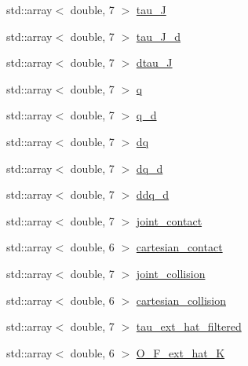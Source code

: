 \begin{DoxyCompactItemize}
\item 
std\+::array$<$ double, 7 $>$ \hyperlink{structresearch__interface_1_1robot_1_1RobotState_a628f89cdefb369bb24c0acfd243ce51d}{tau\+\_\+J}
\item 
std\+::array$<$ double, 7 $>$ \hyperlink{structresearch__interface_1_1robot_1_1RobotState_a83eac6dbd25a9bf4e4ff6d8ce68520da}{tau\+\_\+\+J\+\_\+d}
\item 
std\+::array$<$ double, 7 $>$ \hyperlink{structresearch__interface_1_1robot_1_1RobotState_ab3ac5242c13aa5d0ebf57565ead65b3e}{dtau\+\_\+J}
\item 
std\+::array$<$ double, 7 $>$ \hyperlink{structresearch__interface_1_1robot_1_1RobotState_aaee6a694a7a238bba617f601e4c99a65}{q}
\item 
std\+::array$<$ double, 7 $>$ \hyperlink{structresearch__interface_1_1robot_1_1RobotState_a8ecb35e60683c93138dac95c918222a2}{q\+\_\+d}
\item 
std\+::array$<$ double, 7 $>$ \hyperlink{structresearch__interface_1_1robot_1_1RobotState_a1c2564cb64d0cffc984c3c52bb1128cf}{dq}
\item 
std\+::array$<$ double, 7 $>$ \hyperlink{structresearch__interface_1_1robot_1_1RobotState_adb33fcacd81647769cb3c55665e87923}{dq\+\_\+d}
\item 
std\+::array$<$ double, 7 $>$ \hyperlink{structresearch__interface_1_1robot_1_1RobotState_a4f04c24653108cc9c45aad3d091131a6}{ddq\+\_\+d}
\item 
std\+::array$<$ double, 7 $>$ \hyperlink{structresearch__interface_1_1robot_1_1RobotState_a79a76bc6457428444d91fb7877233156}{joint\+\_\+contact}
\item 
std\+::array$<$ double, 6 $>$ \hyperlink{structresearch__interface_1_1robot_1_1RobotState_a0a4d7e24f71507c25f567f145cd99f87}{cartesian\+\_\+contact}
\item 
std\+::array$<$ double, 7 $>$ \hyperlink{structresearch__interface_1_1robot_1_1RobotState_a84fde387cce0a855a6cb620f7de4d06c}{joint\+\_\+collision}
\item 
std\+::array$<$ double, 6 $>$ \hyperlink{structresearch__interface_1_1robot_1_1RobotState_a26957c17524dd6dbe3b8327db571403a}{cartesian\+\_\+collision}
\item 
std\+::array$<$ double, 7 $>$ \hyperlink{structresearch__interface_1_1robot_1_1RobotState_a05a75a665b3e0469299a49c3651ae8f5}{tau\+\_\+ext\+\_\+hat\+\_\+filtered}
\item 
std\+::array$<$ double, 6 $>$ \hyperlink{structresearch__interface_1_1robot_1_1RobotState_ae521232c3bef7d6a66145a852149e0e1}{O\+\_\+\+F\+\_\+ext\+\_\+hat\+\_\+K}

\end{DoxyCompactItemize}
